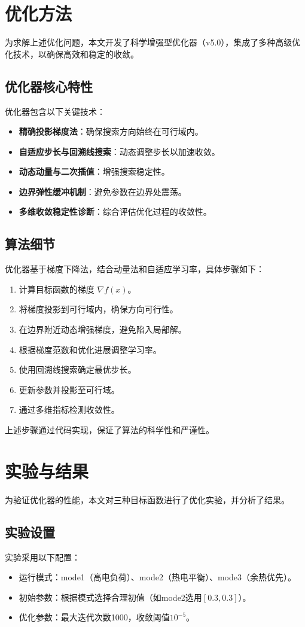 \documentclass[a4paper,12pt]{article}
\begin{document}
\section{优化方法}
为求解上述优化问题，本文开发了科学增强型优化器（v5.0），集成了多种高级优化技术，以确保高效和稳定的收敛。

\subsection{优化器核心特性}
优化器包含以下关键技术：
\begin{itemize}
    \item \textbf{精确投影梯度法}：确保搜索方向始终在可行域内。
    \item \textbf{自适应步长与回溯线搜索}：动态调整步长以加速收敛。
    \item \textbf{动态动量与二次插值}：增强搜索稳定性。
    \item \textbf{边界弹性缓冲机制}：避免参数在边界处震荡。
    \item \textbf{多维收敛稳定性诊断}：综合评估优化过程的收敛性。
\end{itemize}

\subsection{算法细节}
优化器基于梯度下降法，结合动量法和自适应学习率，具体步骤如下：
\begin{enumerate}
    \item 计算目标函数的梯度 $\nabla f(x)$。
    \item 将梯度投影到可行域内，确保方向可行性。
    \item 在边界附近动态增强梯度，避免陷入局部解。
    \item 根据梯度范数和优化进展调整学习率。
    \item 使用回溯线搜索确定最优步长。
    \item 更新参数并投影至可行域。
    \item 通过多维指标检测收敛性。
\end{enumerate}
上述步骤通过代码实现，保证了算法的科学性和严谨性。

\section{实验与结果}
为验证优化器的性能，本文对三种目标函数进行了优化实验，并分析了结果。

\subsection{实验设置}
实验采用以下配置：
\begin{itemize}
    \item 运行模式：mode1（高电负荷）、mode2（热电平衡）、mode3（余热优先）。
    \item 初始参数：根据模式选择合理初值（如mode2选用$[0.3, 0.3]$）。
    \item 优化参数：最大迭代次数1000，收敛阈值$10^{-5}$。
\end{itemize}
\end{document}
